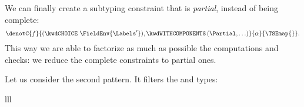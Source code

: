 We can finally create a subtyping constraint that is \emph{partial},
instead of being complete:
\begin{equation*}
\denotC{f}{(\kwdCHOICE \,\, \FieldEnv{\Labels'}), \kwdWITHCOMPONENTS
    \, (\Partial, \ldots)}{\alpha}{\TSEmap{}}.
\end{equation*}
This way we are able to factorize as much as possible the computations
and checks: we reduce the complete constraints to partial ones.

Let us consider the second pattern. It filters the \kwdSET{} and
\kwdSEQUENCE{} types:

\medskip

\noindent
\begin{tabular}{lll}
\end{tabular}

